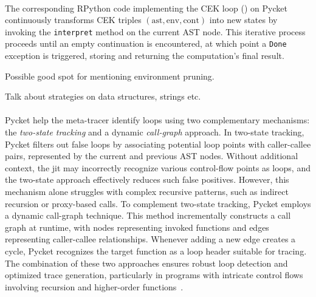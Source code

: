         \paragraph{}%
            The corresponding RPython code implementing the CEK loop () on Pycket continuously transforms CEK triples $(\text{ast}, \text{env}, \text{cont})$ into new states by invoking the \texttt{interpret} method on the current AST node. This iterative process proceeds until an empty continuation is encountered, at which point a \texttt{Done} exception is triggered, storing and returning the computation’s final result.

        \begin{paragraph-here}[TODO]
            Possible good spot for mentioning environment pruning.
        \end{paragraph-here}

        \begin{paragraph-here}[TODO]
            Talk about strategies on data structures, strings etc.
        \end{paragraph-here}

        \paragraph{}%
            Pycket help the meta-tracer identify loops using two complementary mechanisms: the \emph{two-state tracking} and a dynamic \emph{call-graph} approach. In two-state tracking, Pycket filters out false loops by associating potential loop points with caller-callee pairs, represented by the current and previous AST nodes. Without additional context, the \gls{jit} may incorrectly recognize various control-flow points as loops, and the two-state approach effectively reduces such false positives. However, this mechanism alone struggles with complex recursive patterns, such as indirect recursion or proxy-based calls. To complement two-state tracking, Pycket employs a dynamic call-graph technique. This method incrementally constructs a call graph at runtime, with nodes representing invoked functions and edges representing caller-callee relationships. Whenever adding a new edge creates a cycle, Pycket recognizes the target function as a loop header suitable for tracing. The combination of these two approaches ensures robust loop detection and optimized trace generation, particularly in programs with intricate control flows involving recursion and higher-order functions~\cite{pycketmain, pycketmain2}.

